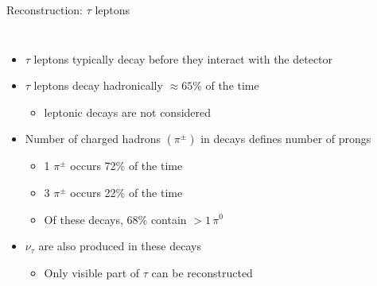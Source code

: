 \documentclass[aspectratio=169,xcolor=table]{beamer}
\begin{document}
    \begin{frame}[t]{Reconstruction: $\tau$ leptons}
      \begin{columns}
        \begin{itemize}
          \item $\tau$ leptons typically decay before they interact with the detector
          \item $\tau$ leptons decay hadronically $\approx 65\%$ of the time
          \begin{itemize}
            \item leptonic decays are not considered
          \end{itemize}
          \item Number of charged hadrons $(\pi^{\pm})$ in decays defines number of prongs
          \begin{itemize}
            \item 1 $\pi^{\pm}$ occurs 72\% of the time
            \item 3 $\pi^{\pm}$ occurs 22\% of the time
            \item Of these decays, 68\% contain $> 1\, \pi^{0}$
          \end{itemize}
          \item $\nu_{\tau}$ are also produced in these decays
          \begin{itemize}
            \item  Only visible part of $\tau$ can be reconstructed
          \end{itemize}
        \end{itemize}


\end{columns}
\end{frame}
\end{document}
